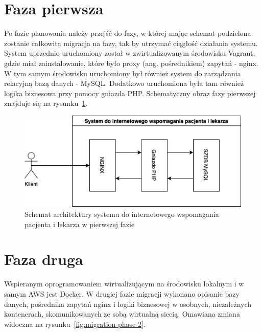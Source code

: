 \documentclass[12pt,twoside]{book}
\newcommand{\captionvspace}{\vspace{6pt}}
\begin{document}
    \section{Faza pierwsza}
    Po fazie planowania należy przejść do fazy, w której mając schemat podzielona zostanie całkowita migracja na fazy, tak by utrzymać ciągłość działania systemu. System uprzednio uruchomiony został w zwirtualizowanym środowisku Vagrant, gdzie miał zainstalowanie, które było proxy (ang. pośrednikiem) zapytań - nginx. W tym samym środowisku uruchomiony był również system do zarządzania relacyjną bazą danych - MySQL. Dodatkowo uruchomiona była tam również logika biznesowa przy pomocy gniazda PHP. Schematyczny obraz fazy pierwszej znajduje się na rysunku~\ref{fig:migration-phase-1}.

    \begin{figure}[ht]
        \centering
        \includegraphics[width=\textwidth]{includes/images/migration-phase-1.png}
        \captionvspace
        \caption{Schemat architektury systemu do internetowego wspomagania pacjenta i lekarza w pierwszej fazie}
        \label{fig:migration-phase-1}
    \end{figure}


    \section{Faza druga}
    Wspieranym oprogramowaniem wirtualizującym na środowisku lokalnym i w samym AWS jest Docker. W drugiej fazie migracji wykonano opisanie bazy danych, pośrednika zapytań nginx i logiki biznesowej w osobnych, niezależnych kontenerach, skomunikowanych ze sobą wirtualną siecią. Omawiana zmiana widoczna na rysunku~\ref{fig:migration-phase-2}.
\end{document}
